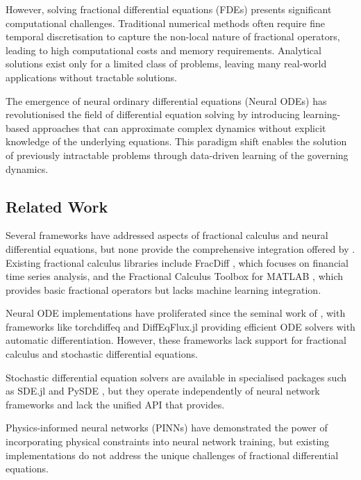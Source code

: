 However, solving fractional differential equations (FDEs) presents significant computational challenges. Traditional numerical methods often require fine temporal discretisation to capture the non-local nature of fractional operators, leading to high computational costs and memory requirements. Analytical solutions exist only for a limited class of problems, leaving many real-world applications without tractable solutions.

The emergence of neural ordinary differential equations (Neural ODEs) \citep{chen2018neural} has revolutionised the field of differential equation solving by introducing learning-based approaches that can approximate complex dynamics without explicit knowledge of the underlying equations. This paradigm shift enables the solution of previously intractable problems through data-driven learning of the governing dynamics.

\subsection{Related Work}

Several frameworks have addressed aspects of fractional calculus and neural differential equations, but none provide the comprehensive integration offered by \hpfracc. Existing fractional calculus libraries include FracDiff \citep{fracdiff}, which focuses on financial time series analysis, and the Fractional Calculus Toolbox for MATLAB \citep{matlab_fractional}, which provides basic fractional operators but lacks machine learning integration.

Neural ODE implementations have proliferated since the seminal work of \citet{chen2018neural}, with frameworks like torchdiffeq \citep{torchdiffeq} and DiffEqFlux.jl \citep{diffeqflux} providing efficient ODE solvers with automatic differentiation. However, these frameworks lack support for fractional calculus and stochastic differential equations.

Stochastic differential equation solvers are available in specialised packages such as SDE.jl \citep{sde_jl} and PySDE \citep{pysde}, but they operate independently of neural network frameworks and lack the unified API that \hpfracc provides.

Physics-informed neural networks (PINNs) \citep{raissi2019physics} have demonstrated the power of incorporating physical constraints into neural network training, but existing implementations do not address the unique challenges of fractional differential equations.

